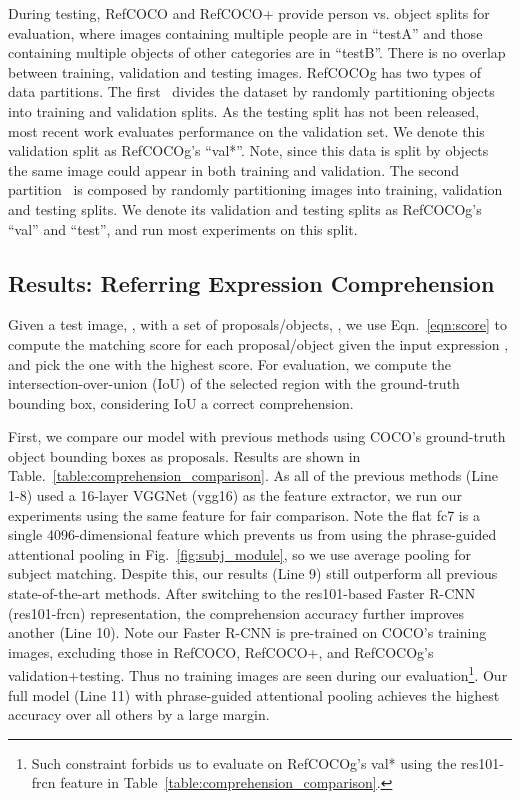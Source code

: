 During testing, RefCOCO and RefCOCO+ provide person vs. object splits for evaluation, where images containing multiple people are in ``testA'' and those containing multiple objects of other categories are in ``testB''.
There is no overlap between training, validation and testing images.
RefCOCOg has two types of data partitions.
The first~\cite{mao2015generation} divides the dataset by randomly partitioning objects into training and validation splits.
As the testing split has not been released, most recent work evaluates performance on the validation set.
We denote this validation split as RefCOCOg's ``val*''.
Note, since this data is split by objects the same image could appear in both training and validation.
The second partition~\cite{nagaraja16refexp} is composed by randomly partitioning images into training, validation and testing splits.
We denote its validation and testing splits as RefCOCOg's ``val'' and ``test'', and run most experiments on this split.


\subsection{Results: Referring Expression Comprehension}
\label{sec:results_comprehension}
\vspace{-.1cm}
Given a test image, , with a set of proposals/objects, , we use Eqn.~\ref{eqn:score} to compute the matching score  for each proposal/object given the input expression , and pick the one with the highest score.
For evaluation, we compute the intersection-over-union (IoU) of the selected region with the ground-truth bounding box, considering IoU  a correct comprehension.

First, we compare our model with previous methods using COCO's ground-truth object bounding boxes as proposals. Results are shown in Table.~\ref{table:comprehension_comparison}.
As all of the previous methods (Line 1-8) used a 16-layer VGGNet (vgg16) as the feature extractor, we run our experiments using the same feature for fair comparison. Note the flat fc7 is a single 4096-dimensional feature which prevents us from using the phrase-guided attentional pooling in Fig.~\ref{fig:subj_module}, so we use average pooling for subject matching. Despite this, our results (Line 9) still outperform all previous state-of-the-art methods.
After switching to the res101-based Faster R-CNN (res101-frcn) representation, the comprehension accuracy further improves another  (Line 10).
Note our Faster R-CNN is pre-trained on COCO's training images, excluding those in RefCOCO, RefCOCO+, and RefCOCOg's validation+testing.
Thus no training images are seen during our evaluation\footnote{Such constraint forbids us to evaluate on RefCOCOg's val* using the res101-frcn feature in Table~\ref{table:comprehension_comparison}.}.
Our full model (Line 11) with phrase-guided attentional pooling achieves the highest accuracy over all others by a large margin.

